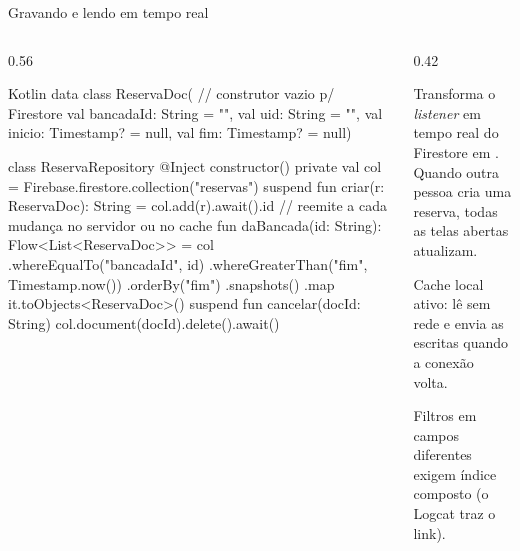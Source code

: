 \documentclass[aspectratio=169,10pt]{beamer}
\begin{document}
\begin{frame}[fragile]{Gravando e lendo em tempo real}
  \begin{columns}[T]
    \begin{column}{0.56\textwidth}
\begin{codigo}[title=ReservaRepository.kt]{Kotlin}
data class ReservaDoc(        // construtor vazio p/ Firestore
  val bancadaId: String = "", val uid: String = "",
  val inicio: Timestamp? = null, val fim: Timestamp? = null)

class ReservaRepository @Inject constructor() {
  private val col = Firebase.firestore.collection("reservas")
  suspend fun criar(r: ReservaDoc): String =
    col.add(r).await().id
  // reemite a cada mudança no servidor ou no cache
  fun daBancada(id: String): Flow<List<ReservaDoc>> = col
    .whereEqualTo("bancadaId", id)
    .whereGreaterThan("fim", Timestamp.now())
    .orderBy("fim")
    .snapshots()
    .map { it.toObjects<ReservaDoc>() }
  suspend fun cancelar(docId: String) {
    col.document(docId).delete().await()
  }
}
\end{codigo}
    \end{column}
    \begin{column}{0.42\textwidth}
      \begin{conceito}
        Transforma o \emph{listener} em tempo real do Firestore em . Quando outra pessoa cria uma reserva, todas as telas abertas atualizam.
      \end{conceito}
      \begin{conceito}[Offline]
        Cache local ativo: lê sem rede e envia as escritas quando a conexão volta.
      \end{conceito}
      \begin{atencao}[Índices]
        Filtros em campos diferentes exigem índice composto (o Logcat traz o link).
      \end{atencao}
    \end{column}
  \end{columns}
\end{frame}
\end{document}
